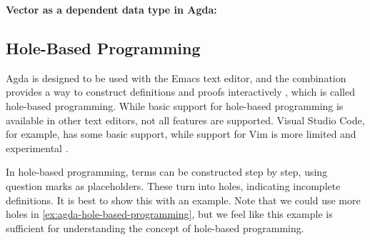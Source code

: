 \begin{example}
  \label{ex:agda-dependent-data-type}
  \textbf{Vector as a dependent data type in Agda:}
  
\end{example}
\subsection{Hole-Based Programming}
Agda is designed to be used with the Emacs text editor, and the combination provides a way to construct definitions and proofs interactively \cite{agda-emacs-mode, AgdaDocs, Norell2007}, which is called hole-based programming.
While basic support for hole-based programming is available in other text editors, not all features are supported.
Visual Studio Code, for example, has some basic support, while support for Vim is more limited and experimental \cite{AgdaDocs}.

In hole-based programming, terms can be constructed step by step, using question marks as placeholders. These turn into holes, indicating incomplete definitions.
It is best to show this with an example. Note that we could use more holes in \cref{ex:agda-hole-based-programming},
but we feel like this example is sufficient for understanding the concept of hole-based programming.

